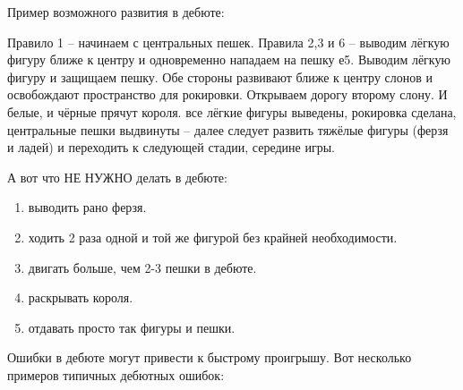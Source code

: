 Пример возможного развития в дебюте:

\newchessgame[id=DebutSample]
Правило 1 -- начинаем с центральных пешек. 
Правила 2,3 и 6 -- выводим лёгкую фигуру ближе к центру и одновременно нападаем на пешку е5.
Выводим лёгкую фигуру и защищаем пешку.
Обе стороны развивают ближе к центру слонов и освобождают пространство для рокировки.
Открываем дорогу второму слону. 
И белые, и чёрные прячут короля.
все лёгкие фигуры выведены, рокировка сделана, центральные пешки выдвинуты – далее следует развить тяжёлые фигуры (ферзя и ладей) и переходить к следующей стадии, середине игры. 

А вот что НЕ НУЖНО делать в дебюте:
\begin{enumerate}
\item выводить рано ферзя.
\item ходить 2 раза одной и той же фигурой без крайней необходимости.
\item двигать больше, чем 2-3 пешки в дебюте.
\item раскрывать короля.
\item отдавать просто так фигуры и пешки.
\end{enumerate}

Ошибки в дебюте могут привести к быстрому проигрышу. Вот несколько примеров типичных дебютных ошибок:

